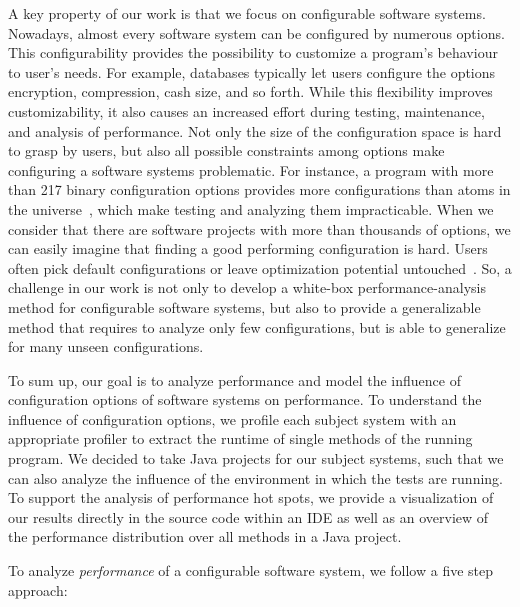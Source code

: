 A key property of our work is that we focus on configurable software systems. 
Nowadays, almost every software system can be configured by numerous options. 
This configurability provides the possibility to customize a program's behaviour to user's needs. 
For example, databases typically let users configure the options encryption, compression, cash size, and so forth. 
While this flexibility improves customizability, it also causes an increased effort during testing, maintenance, and analysis of performance. 
Not only the size of the configuration space is hard to grasp by users, but also all possible constraints among options make configuring a software systems problematic.
For instance, a program with more than 217 binary configuration options provides more configurations than atoms in the universe~\citep{krueger2006new}, which make testing and analyzing them impracticable. 
When we consider that there are software projects with more than thousands of options, we can easily imagine that finding a good performing configuration is hard.
Users often pick default configurations or leave optimization potential untouched~\cite{xu2015hey}.
So, a challenge in our work is not only to develop a white-box performance-analysis method for configurable software systems, but also to provide a generalizable method that requires to analyze only few configurations, but is able to generalize for many unseen configurations.

To sum up, our goal is to analyze performance and model the influence of configuration options of software systems on performance. 
To understand the influence of configuration options, we profile each subject system with an appropriate profiler to extract the runtime of single methods of the running program. 
We decided to take Java projects for our subject systems, such that we can also analyze the influence of the environment in which the tests are running. 
To support the analysis of performance hot spots, we provide a visualization of our results directly in the source code within an \ac{IDE} as well as an overview of the performance distribution over all methods in a Java project.


To analyze \textit{performance} of a configurable software system, we follow a five step approach:

